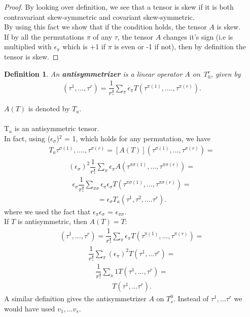 \documentclass[12pt,a4paper]{article}
\newtheorem{defn}[thm]{Definition}
\begin{document}
\begin{proof}
By looking over definition, we see that a tensor is skew if it is both contravariant skew-symmetric and covariant skew-symmetric. \\
By using this fact we show that if the condition holds, the tensor $A$ is skew.\\
If by all the permutations $\pi$ of any $\tau$, the tensor $A$ changes it's sign (i.e is multiplied with $\epsilon_\pi$ which is +1 if $\pi$ is even or -1 if not), then by definition the tensor is skew.
\end{proof}
\begin{defn}
An \textbf{antisymmetrizer} is a linear operator $A$ on T$^r_0$, given by 
\begin{align*}
[A(T)](\tau^1,...,\tau^r) = \dfrac{1}{r!}\sum_{\pi} \epsilon_\pi T(\tau^{\pi(1)},....,\tau^{\pi(r)}).
\end{align*}
\end{defn}
$A(T)$ is denoted by $T$$_a$.\\\\
\hspace{1cm} T$_a$ is an antisymmetric tensor. \\In fact, using ($\epsilon_\sigma$)$^2$ = 1, which holds for any permutation, we have\\
\begin{align*}
T_a \tau^{\sigma(1)},....,\tau^{\sigma(r)} = [A(T)](\tau^{\sigma(1)},...,\tau^{\sigma(r)})=
\end{align*}
\begin{align*}
(\epsilon_\sigma)^2 \dfrac{1}{r!} \sum_{\pi} \epsilon_\pi A(\tau^{\pi\sigma(1)},...,\tau^{\pi\sigma(r)}) =
\end{align*}
\begin{align*}
\epsilon_\sigma \dfrac{1}{r!} \sum_{\pi\sigma} \epsilon_\pi \epsilon_\sigma T(\tau^{\pi\sigma(1)},...,\tau^{\pi\sigma(r)})=
\end{align*}
\begin{align*}
=\epsilon_\sigma T_a(\tau^1,\tau^2,....\tau^r).
\end{align*}
where we used the fact that $\epsilon_\pi \epsilon_\sigma$ = $\epsilon_{\pi\sigma}$. \\
\hspace{1cm} If $T$ is antisymmetric, then $A(T) = T:$\\
\begin{align*}
[A(T)](\tau^1,...,\tau^r) = \dfrac{1}{r!}\sum_{\pi}\epsilon_\pi T(\tau^{\pi(1)},...,\tau^{\pi(r)})=
\end{align*}
\begin{align*}
\dfrac{1}{r!}\sum_{\pi}(\epsilon_\pi)^2 T(\tau^1,...\tau^r) =
\end{align*}
\begin{align*}
\dfrac{1}{r!} \sum_{\pi} 1 T(\tau^1,...,\tau^r) =
\end{align*}
\begin{align*}
 T(\tau^1,...\tau^r).
\end{align*}
\hspace{1cm} A similar definition gives the antisymmetrizer $A$ on $T_s^0$. Instead of $\tau^1,...\tau^r$ we would have used $v_1,...v_s$.
\end{document}
